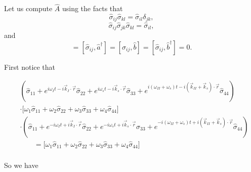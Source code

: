 \documentclass[aps,pra,showpacs,amsmath,amssymb,nofootinbib,longbibliography,superscriptaddress
]{revtex4-1}
\theoremstyle{definition}
\theoremstyle{remark}
\newcommand{\0}{\hat{0}}
\begin{document}
Let us compute $\hat{A}$ using the facts that
\begin{equation}
    \hat{\sigma}_{ij} \hat{\sigma}_{kl} = \hat{\sigma}_{il} \delta_{jk},
\end{equation}
\begin{equation}
    \hat{\sigma}_{ij} \hat{\sigma}_{jk} \hat{\sigma}_{kl} = \hat{\sigma}_{il},
\end{equation}
and
\begin{equation}
    [\hat{\sigma}_{ij}, \hat{a}] = [\hat{\sigma}_{ij}, \hat{a}^{\dagger}] = [\hat{\sigma}_{ij}, \hat{b}] = [\hat{\sigma}_{ij}, \hat{b}^{\dagger}] = 0.
\end{equation}

First notice that

\begin{align}
&\left(
    \hat{\sigma}_{11} +
    e^{i \omega_I t - i \vec{k}_I \cdot \vec{r}} \hat{\sigma}_{22} +
    e^{i \omega_s t - i \vec{k}_s \cdot \vec{r}} \hat{\sigma}_{33} +
    e^{i(\omega_{II} + \omega_s) t - i(\vec{k}_{II} + \vec{k}_s) \cdot \vec{r}} \hat{\sigma}_{44}
\right) \nonumber\\
&\cdot\biggl[
    \omega_1 \hat{\sigma}_{11} +
    \omega_2 \hat{\sigma}_{22} +
    \omega_3 \hat{\sigma}_{33} +
    \omega_4 \hat{\sigma}_{44}
\biggr] \nonumber \\
&\cdot\left(
    \hat{\sigma}_{11} +
    e^{-i \omega_I t + i \vec{k}_I \cdot \vec{r}} \hat{\sigma}_{22} +
    e^{-i \omega_s t + i \vec{k}_s \cdot \vec{r}} \hat{\sigma}_{33} +
    e^{-i(\omega_{II} + \omega_s) t + i(\vec{k}_{II} + \vec{k}_s) \cdot \vec{r}} \hat{\sigma}_{44}
\right)\\
&\;\;\;\;\;\;\; = 
\biggl[
    \omega_1 \hat{\sigma}_{11} +
    \omega_2 \hat{\sigma}_{22} +
    \omega_3 \hat{\sigma}_{33} +
    \omega_4 \hat{\sigma}_{44}
\biggr] \nonumber \\
\end{align}

So we have
\end{document}
